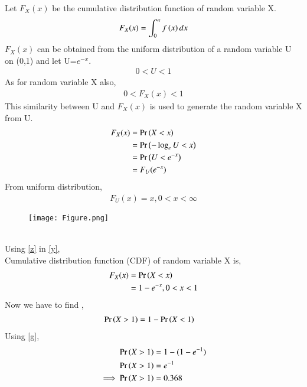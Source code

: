 \documentclass[journal,12pt,twocolumn]{IEEEtran}
\begin{document}
Let $F_X(x)$ be the cumulative distribution function of random variable X.
\begin{align}
    F_X(x)=\int_{0}^x f\left(x\right) dx\label{x}
\end{align}
$F_X(x)$ can be obtained from the uniform distribution of a random variable U on (0,1) and let U=$e^{-x}$. 
\begin{align}
    0 < U < 1
\end{align}
As for random variable X also,
\begin{align}
    0 < F_X(x) < 1
\end{align}
This similarity between U and $F_X(x)$ is used to generate the random variable X from U.
\begin{align}
    F_X(x)&=\Pr\left(X<x\right)\\
    &=\Pr\left(-\log_e U<x\right)\\
    &=\Pr\left(U<e^{-x}\right)\\
    &=F_U(e^{-x})\label{y}
\end{align}
From uniform distribution,
\begin{align}
    F_U(x)= x ,0<x<\infty \label{z}
\end{align}
\begin{figure}[htp]
    \centering
    \texttt{[image: Figure.png]}
\end{figure}
\\Using \eqref{z} in \eqref{y},
\\Cumulative distribution function (CDF) of random variable X is,
\begin{align}
F_X(x) &= \Pr\left(X<x\right)\\
&= 1 -e^{-x} ,0<x<1 \label{g}
\end{align}
Now we have to find ,
\begin{align}
    \Pr\left(X>1\right) &= 1-\Pr\left(X<1\right)
\end{align}
Using  \eqref{g},
\begin{align}
    \Pr\left(X>1\right) &= 1-(1 -e^{-1})\\
    \Pr\left(X>1\right) &= e^{-1}\\
   \implies \Pr\left(X>1\right) &= 0.368 
\end{align}
\end{document}
